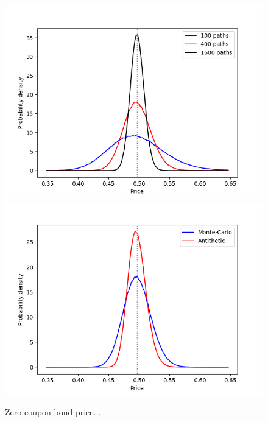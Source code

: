 
\begin{figure}
\centering
\includegraphics[scale=0.7]{figures/hw_1f_zero_coupon_bond/density_2d_ZCBond_False.png}
\includegraphics[scale=0.7]{figures/hw_1f_zero_coupon_bond/density_2d_ZCBond_400.png}
\caption{Zero-coupon bond price...}
\end{figure}


